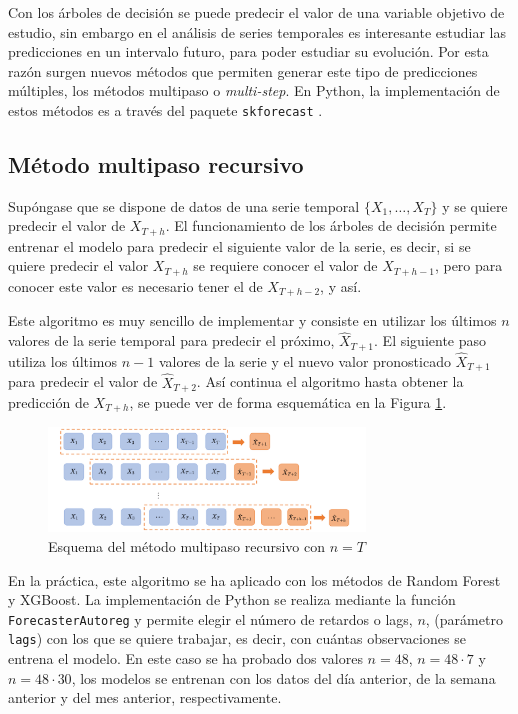 \documentclass[12pt,twoside]{article}
\begin{document}
Con los árboles de decisión se puede predecir el valor de una variable objetivo de estudio, sin embargo en el análisis de series temporales es interesante estudiar las predicciones en un intervalo futuro, para poder estudiar su evolución. Por esta razón surgen nuevos métodos que permiten generar este tipo de predicciones múltiples, los métodos multipaso o \emph{multi-step}. En Python, la implementación de estos métodos es a través del paquete \texttt{skforecast} \cite{DT2}.










\subsection{Método multipaso recursivo}
Supóngase que se dispone de datos de una serie temporal $\{X_1, \dotsc, X_T\}$ y se quiere predecir el valor de $X_{T+h}$. El funcionamiento de los árboles de decisión permite entrenar el modelo para predecir el siguiente valor de la serie, es decir, si se quiere predecir el valor $X_{T+h}$ se requiere conocer el valor de $X_{T+h-1}$, pero para conocer este valor es necesario tener el de $X_{T+h-2}$, y así. 

Este algoritmo es muy sencillo de implementar y consiste en utilizar los últimos $n$ valores de la serie temporal para predecir el próximo, $\hat{X}_{T+1}$. El siguiente paso utiliza los últimos $n-1$ valores de la serie y el nuevo valor pronosticado $\hat{X}_{T+1}$ para predecir el valor de $\hat{X}_{T+2}$. Así continua el algoritmo hasta obtener la predicción de $X_{T+h}$, se puede ver de forma esquemática en la Figura \ref{fig:multistep-recursive}.

\begin{figure}[h]
\centering
    \includegraphics[width = 0.75\textwidth]{imagenes/multistep-recursive.png}
    \caption{Esquema del método multipaso recursivo con $n=T$}\label{fig:multistep-recursive}
\end{figure}


En la práctica, este algoritmo se ha aplicado con los métodos de Random Forest y XGBoost. La implementación de Python se realiza mediante la función \texttt{ForecasterAutoreg} y  permite elegir el número de retardos o lags, $n$, (parámetro \texttt{lags}) con los que se quiere trabajar, es decir, con cuántas observaciones se entrena el modelo. En este caso se ha probado dos valores $n=48$,  $n=48\cdot 7$ y $n=48\cdot 30$, los modelos se entrenan con los datos del día anterior, de la semana anterior y del mes anterior, respectivamente. 
\end{document}
